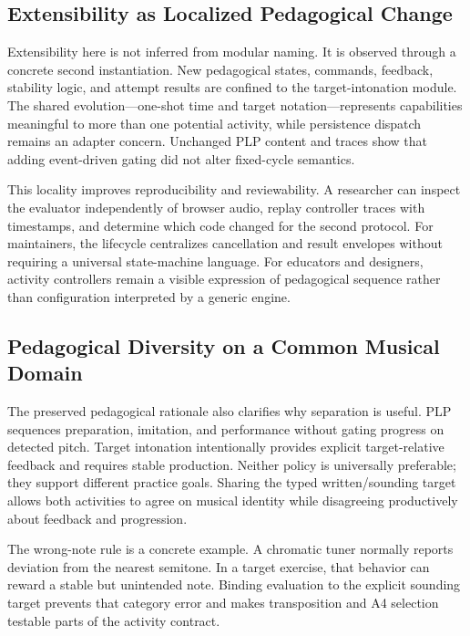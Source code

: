 \documentclass[runningheads]{llncs}
\begin{document}
\subsection{Extensibility as Localized Pedagogical Change}

Extensibility here is not inferred from modular naming. It is observed through
a concrete second instantiation. New pedagogical states, commands, feedback,
stability logic, and attempt results are confined to the target-intonation
module. The shared evolution---one-shot time and target notation---represents
capabilities meaningful to more than one potential activity, while persistence
dispatch remains an adapter concern. Unchanged PLP content and traces show that
adding event-driven gating did not alter fixed-cycle semantics.

This locality improves reproducibility and reviewability. A researcher can
inspect the evaluator independently of browser audio, replay controller traces
with timestamps, and determine which code changed for the second protocol.
For maintainers, the lifecycle centralizes cancellation and result envelopes
without requiring a universal state-machine language. For educators and
designers, activity controllers remain a visible expression of pedagogical
sequence rather than configuration interpreted by a generic engine.

\subsection{Pedagogical Diversity on a Common Musical Domain}

The preserved pedagogical rationale also clarifies why separation is useful.
PLP sequences preparation, imitation, and performance without gating progress
on detected pitch. Target intonation intentionally provides explicit
target-relative feedback and requires stable production. Neither policy is
universally preferable; they support different practice goals. Sharing the
typed written/sounding target allows both activities to agree on musical
identity while disagreeing productively about feedback and progression.

The wrong-note rule is a concrete example. A chromatic tuner normally reports
deviation from the nearest semitone. In a target exercise, that behavior can
reward a stable but unintended note. Binding evaluation to the explicit
sounding target prevents that category error and makes transposition and A4
selection testable parts of the activity contract.
\end{document}
